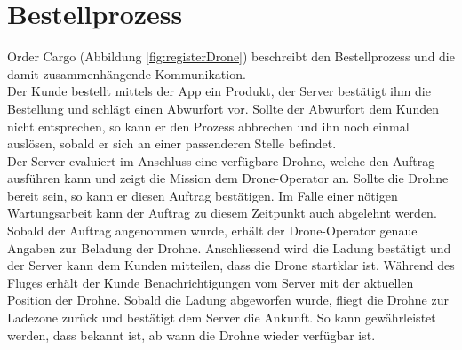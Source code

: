 {\section{Bestellprozess}

Order Cargo (Abbildung \ref{fig:registerDrone}) beschreibt den Bestellprozess und die damit zusammenhängende Kommunikation. \\

Der Kunde bestellt mittels der App ein Produkt, der Server bestätigt ihm die Bestellung und schlägt einen Abwurfort vor. Sollte der Abwurfort dem Kunden nicht entsprechen, so kann er den Prozess abbrechen und ihn noch einmal auslösen, sobald er sich an einer passenderen Stelle befindet.\\

Der Server evaluiert im Anschluss eine verfügbare Drohne, welche den Auftrag ausführen kann und zeigt die Mission dem Drone-Operator an. Sollte die Drohne bereit sein, so kann er diesen Auftrag bestätigen. Im Falle einer nötigen Wartungsarbeit kann der Auftrag zu diesem Zeitpunkt auch abgelehnt werden. Sobald der Auftrag angenommen wurde, erhält der Drone-Operator genaue Angaben zur Beladung der Drohne. Anschliessend wird die Ladung bestätigt und der Server kann dem Kunden mitteilen, dass die Drone startklar ist. Während des Fluges erhält der Kunde Benachrichtigungen vom Server mit der aktuellen Position der Drohne. Sobald die Ladung abgeworfen wurde, fliegt die Drohne zur Ladezone zurück und bestätigt dem Server die Ankunft. So kann gewährleistet werden, dass bekannt ist, ab wann die Drohne wieder verfügbar ist. \\

}
